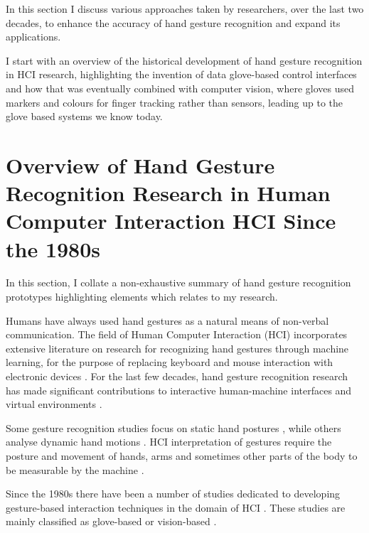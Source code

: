 In this section I discuss various approaches taken by researchers, over the last two decades, to enhance the accuracy of hand gesture recognition and expand its applications.

I start with an overview of the historical development of hand gesture recognition in HCI research, highlighting the invention of data glove-based control interfaces and how that was eventually combined with computer vision, where gloves used markers and colours for finger tracking rather than sensors, leading up to the glove based systems we know today. 

\section{Overview of Hand Gesture Recognition Research in Human Computer Interaction HCI Since the 1980s}

In this section, I collate a non-exhaustive summary of hand gesture recognition prototypes highlighting elements which relates to my research. 

Humans have always used hand gestures as a natural means of non-verbal communication. The field of Human Computer Interaction (HCI) incorporates extensive literature on research for recognizing hand gestures through machine learning, for the purpose of replacing keyboard and mouse interaction with electronic devices \parencite{Takahashi1992}. For the last few decades, hand gesture recognition research has made significant contributions to interactive human-machine interfaces and virtual environments \parencite{Takahashi1992}. 

Some gesture recognition studies focus on static hand postures \parencite{Klboz2015}, while others analyse dynamic hand motions \parencite{Rigoll1997}. HCI interpretation of gestures require the posture and movement of hands, arms and sometimes other parts of the body to be measurable by the machine \parencite{Pavlovic1997}.

Since the 1980s there have been a number of studies dedicated to developing gesture-based interaction techniques in the domain of HCI \parencite{Rautaray2015}. These studies are mainly classified as glove-based or vision-based \parencite{Rautaray2015}  \parencite{Pavlovic1997}.

